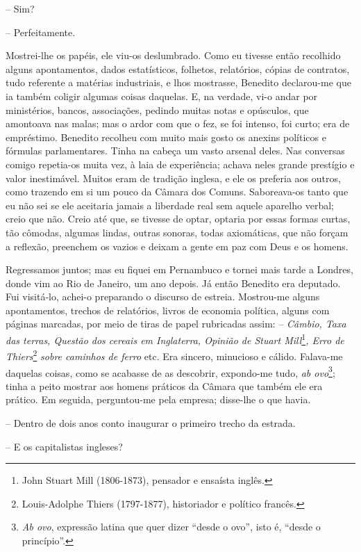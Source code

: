 -- Sim?

-- Perfeitamente.

Mostrei-lhe os papéis, ele viu-os deslumbrado. Como eu tivesse então
recolhido alguns apontamentos, dados estatísticos, folhetos, relatórios,
cópias de contratos, tudo referente a matérias industriais, e lhos
mostrasse, Benedito declarou-me que ia também coligir algumas coisas
daquelas. E, na verdade, vi-o andar por ministérios, bancos,
associações, pedindo muitas notas e opúsculos, que amontoava nas malas;
mas o ardor com que o fez, se foi intenso, foi curto; era de empréstimo.
Benedito recolheu com muito mais gosto os anexins políticos e fórmulas
parlamentares. Tinha na cabeça um vasto arsenal deles. Nas conversas
comigo repetia-os muita vez, à laia de experiência; achava neles grande
prestígio e valor inestimável. Muitos eram de tradição inglesa, e ele os
preferia aos outros, como trazendo em si um pouco da Câmara dos Comuns.
Saboreava-os tanto que eu não sei se ele aceitaria jamais a liberdade
real sem aquele aparelho verbal; creio que não. Creio até que, se
tivesse de optar, optaria por essas formas curtas, tão cômodas, algumas
lindas, outras sonoras, todas axiomáticas, que não forçam a reflexão,
preenchem os vazios e deixam a gente em paz com Deus e os homens.

Regressamos juntos; mas eu fiquei em Pernambuco e tornei mais tarde a
Londres, donde vim ao Rio de Janeiro, um ano depois. Já então Benedito
era deputado. Fui visitá-lo, achei-o preparando o discurso de estreia.
Mostrou-me alguns apontamentos, trechos de relatórios, livros de
economia política, alguns com páginas marcadas, por meio de tiras de
papel rubricadas assim: -- \emph{Câmbio, Taxa das terras, Questão dos
cereais em Inglaterra, Opinião de Stuart Mill}\footnote{John Stuart Mill
  (1806-1873), pensador e ensaísta inglês.}\emph{, Erro de
Thiers}\footnote{Louis-Adolphe Thiers (1797-1877), historiador e
  político francês.} \emph{sobre caminhos de ferro} etc. Era sincero,
minucioso e cálido. Falava-me daquelas coisas, como se acabasse de as
descobrir, expondo-me tudo, \emph{ab ovo}\footnote{\emph{Ab ovo},
  expressão latina que quer dizer ``desde o ovo'', isto é, ``desde o
  princípio''.}; tinha a peito mostrar aos homens práticos da Câmara que
também ele era prático. Em seguida, perguntou-me pela empresa; disse-lhe
o que havia.

-- Dentro de dois anos conto inaugurar o primeiro trecho da estrada.

-- E os capitalistas ingleses?

